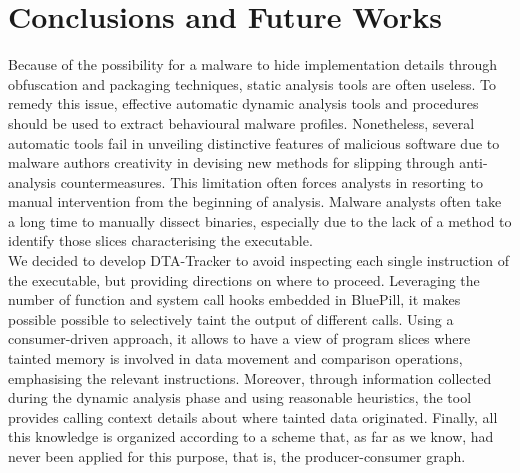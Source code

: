 \documentclass[LaM,binding=0.6cm]{sapthesis}
\begin{document}
\chapter{Conclusions and Future Works}
\label{ch:futureworks}
Because of the possibility for a malware to hide implementation details through obfuscation and packaging techniques, static analysis tools are often useless. To remedy this issue, effective automatic dynamic analysis tools and procedures should be used to extract behavioural malware profiles. Nonetheless, several automatic tools fail in unveiling distinctive features of malicious software due to malware authors creativity in devising new methods for slipping through anti-analysis countermeasures. This limitation often forces analysts in resorting to manual intervention from the beginning of analysis. Malware analysts often take a long time to manually dissect binaries, especially due to the lack of a method to identify those slices characterising the executable.\\

We decided to develop DTA-Tracker to avoid inspecting each single instruction of the executable, but providing directions on where to proceed. Leveraging the number of function and system call hooks embedded in BluePill, it makes possible possible to selectively taint the output of different calls. Using a consumer-driven approach, it allows to have a view of program slices where tainted memory is involved in data movement and comparison operations, emphasising the relevant instructions. Moreover, through information collected during the dynamic analysis phase and using reasonable heuristics, the tool provides calling context details about where tainted data originated. Finally, all this knowledge is organized according to a scheme that, as far as we know, had never been applied for this purpose, that is, the producer-consumer graph.



\backmatter
\cleardoublepage
{}
{}
\end{document}
